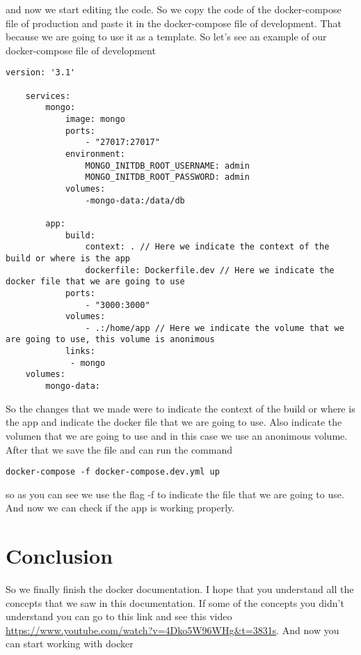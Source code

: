 \documentclass{article}
\begin{document}
and now we start editing the code. So we copy the code of the docker-compose file of production and paste it 
in the docker-compose file of development. That because we are going to use it as a template. So let's see an example of our 
docker-compose file of development
\begin{lstlisting}[breaklines=true, breakatwhitespace=true]
    version: '3.1' 

    services: 
        mongo: 
            image: mongo 
            ports:
                - "27017:27017"
            environment: 
                MONGO_INITDB_ROOT_USERNAME: admin
                MONGO_INITDB_ROOT_PASSWORD: admin
            volumes: 
                -mongo-data:/data/db 
         
        app:
            build: 
                context: . // Here we indicate the context of the build or where is the app 
                dockerfile: Dockerfile.dev // Here we indicate the docker file that we are going to use
            ports:
                - "3000:3000"
            volumes: 
                - .:/home/app // Here we indicate the volume that we are going to use, this volume is anonimous
            links: 
             - mongo
    volumes: 
        mongo-data:
\end{lstlisting}
 
So the changes that we made were to indicate the context of the build or where is the app and indicate the docker file that we are going to use. Also indicate the volumen 
that we are going to use and in this case we use an anonimous volume. After that we save the file and can run the command 
\begin{lstlisting}[breaklines=true, breakatwhitespace=true]
    docker-compose -f docker-compose.dev.yml up
\end{lstlisting}

so as you can see we use the flag -f to indicate the file that we are going to use. And now we can check if the app is working properly. 

\section*{Conclusion}

So we finally finish the docker documentation. I hope that you understand all the concepts that we saw in this documentation. If some of the concepts you didn't 
understand you can go to this link and see this video \url{https://www.youtube.com/watch?v=4Dko5W96WHg&t=3831s}. And now you can start working with docker 
\end{document}
